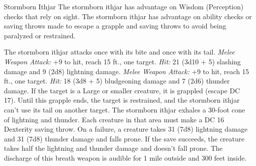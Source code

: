 \documentclass[10pt,a4paper,twoside,twocolumn,openany,bg=print,nodeprecatedcode]{dndbook}
\begin{document}
\begin{DndMonster}[float*=t]{Stormborn Ithjar}
\DndMonsterBasics[
armor-class = {17 (natural armor)},
hit-points = {\DndDice{18d12 + 72}},
speed = {40 ft., 120 ft. (key)}
]
\DndMonsterAbilityScores[
 str = 21,
 dex = 20,
 con = 19,
 int = 3,
 wis = 12,
 cha = 5
]
\DndMonsterDetails[
skills = {Acrobatics +9, Perception +5},
damage-immunities = {lightning, thunder},
senses = {blindsight 10 ft., darkvision 60 ft., passive perception 15},
challenge = 9,
]
The stormborn ithjar has advantage on Wisdom (Perception) checks that rely on sight.
The stormborn ithjar has advantage on ability checks or saving throws made to escape a grapple and saving throws to avoid being paralyzed or restrained.
\par
{}
The stormborn ithjar attacks once with its bite and once with its tail.
\textsl{Melee Weapon Attack:} +9 to hit, reach 15 ft., one target. \textsl{Hit:} 21 (3d10 + 5) slashing damage and 9 (2d8) lightning damage.
\textsl{Melee Weapon Attack:} +9 to hit, reach 15 ft., one target. \textsl{Hit:} 18 (3d8 + 5) bludgeoning damage and 7 (2d6) thunder damage. If the target is a Large or smaller creature, it is grappled (escape DC 17). Until this grapple ends, the target is restrained, and the stormborn ithjar can't use its tail on another target.
The stormborn ithjar exhales a 30-foot cone of lightning and thunder. Each creature in that area must make a DC 16 Dexterity saving throw. On a failure, a creature takes 31 (7d8) lightning damage and 31 (7d8) thunder damage and falls prone. If the save succeeds, the creature takes half the lightning and thunder damage and doesn't fall prone. The discharge of this breath weapon is audible for 1 mile outside and 300 feet inside.
\end{DndMonster}
\end{document}
